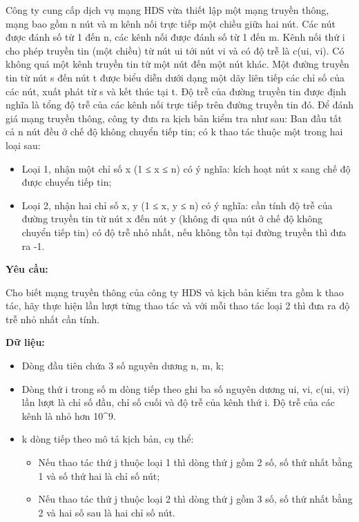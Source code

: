 

Công ty cung cấp dịch vụ mạng HDS vừa thiết lập một mạng truyền thông, mạng bao gồm n nút và m kênh nối trực tiếp một chiều giữa hai nút. Các nút được đánh số từ 1 đến n, các kênh nối được đánh số từ 1 đến m. Kênh nối thứ i cho phép truyền tin (một chiều) từ nút ui tới nút vi và có độ trễ là c(ui, vi). Có không quá một kênh truyền tin từ một nút đến một nút khác. Một đường truyền tin từ nút s đến nút t được biểu diễn dưới dạng một dãy liên tiếp các chỉ số của các nút, xuất phát từ s và kết thúc tại t. Độ trễ của đường truyền tin được định nghĩa là tổng độ trễ của các kênh nối trực tiếp trên đường truyền tin đó. Để đánh giá mạng truyền thông, công ty đưa ra kịch bản kiểm tra như sau: Ban đầu tất cả n nút đều ở chế độ không chuyển tiếp tin; có k thao tác thuộc một trong hai loại sau:
\begin{itemize}
	\item Loại 1, nhận một chỉ số x (1 ≤ x ≤ n) có ý nghĩa: kích hoạt nút x sang chế độ được chuyển tiếp tin;
	\item Loại 2, nhận hai chỉ số x, y (1 ≤ x, y ≤ n) có ý nghĩa: cần tính độ trễ của đường truyền tin từ nút x đến nút y (không đi qua nút ở chế độ không chuyển tiếp tin) có độ trễ nhỏ nhất, nếu không tồn tại đường truyền thì đưa ra -1.
\end{itemize}

\textbf{Yêu cầu:}

Cho biết mạng truyền thông của công ty HDS và kịch bản kiểm tra gồm k thao tác, hãy thực hiện lần lượt từng thao tác và với mỗi thao tác loại 2 thì đưa ra độ trễ nhỏ nhất cần tính.

\textbf{Dữ liệu:}
\begin{itemize}
	\item Dòng đầu tiên chứa 3 số nguyên dương n, m, k;
	\item Dòng thứ i trong số m dòng tiếp theo ghi ba số nguyên dương ui, vi, c(ui, vi) lần lượt là chỉ số đầu, chỉ số cuối và độ trễ của kênh thứ i. Độ trễ của các kênh là nhỏ hơn 10^9.
	\item k dòng tiếp theo mô tả kịch bản, cụ thể:
\begin{itemize}
	\item Nếu thao tác thứ j thuộc loại 1 thì dòng thứ j gồm 2 số, số thứ nhất bằng 1 và số thứ hai là chỉ số nút;
	\item Nếu thao tác thứ j thuộc loại 2 thì dòng thứ j gồm 3 số, số thứ nhất bằng 2 và hai số sau là hai chỉ số nút.
\end{itemize}
\end{itemize}

